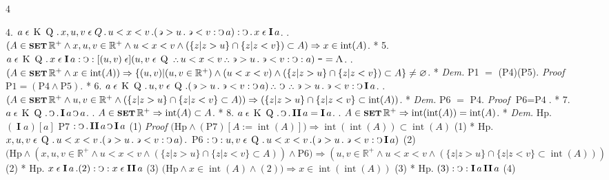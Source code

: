 \documentclass{book}
\newcommand{\s}{\switchcolumn} %
\newcommand{\C}{\mathop{\sbox0{$\displaystyle$$\reflectbox{C}$} %
\raisebox{-\height+\ht0-0.05cm}[\ht0][\dp0]{\scalebox{0.8}[0.8]{\copy0}}}\displaylimits} %
\newcommand{\p}{\mathop{\sbox0{$\displaystyle$$.$}
\raisebox{-\height+\ht0}[\ht0][\dp0]{\scalebox{1}[1]{\copy0}}}\displaylimits} %
\newcommand{\pppNoSpace}{\leavevmode\lower0ex\hbox{.}\kern-0.1em\raise0.7ex\hbox{.}\kern-0.1em\lower0ex\hbox{.}} %
\newcommand{\ppp}{\thinspace \pppNoSpace\thinspace} %
\newcommand{\no}{\mathop{\thinspace \scalebox{1.5}{-}}}
\newcommand{\abs}{\mathop{\rotatebox[origin=c]{180}{V}}}
\newcommand{\larger}{\mathrel{>}}
\newcommand{\smaller}{\mathrel{<}}
\newcommand{\such}{\thinspace \rotatebox[origin=c]{180}{$\epsilon$}}
\newcommand{\smallIn}{\ensuremath{\mathrel{\epsilon}}}
\newcommand{\I}{\mathop{\textbf{I}}}
\newcommand{\K}{\mathop{\thinspace \text{K} \thinspace}}
\newcommand{\Q}{\mathop{\thinspace \text{Q} \thinspace}}
\newcommand{\II}{\mathop{\textbf{I\hspace{0.02cm}I}}}
\newcommand{\setOfSets}{\mathop{\text{{\footnotesize \textbf{SET}}}}}
\renewcommand{\rightarrow}{\Rightarrow}
\DeclareMathOperator{\interior}{int}
\newenvironment{translateFourCol}[4]
               { %
                 \setcolumnwidth{#1\fill/1em, #2\fill/\columnsep, #3\fill/1em, #4\fill}
                 \begin{paracol}{4}
                 \newcommand{\LAT}{\switchcolumn[0]*}
                 \newcommand{\ENG}{\switchcolumn[2]}
               }
               { %
                 \let\ENG\undefined
                 \let\LAT\undefined
                 \end{paracol}
               }
\begin{document}
\begin{translateFourCol}{0.08}{0.42}{0.08}{0.42}
\raggedright
4. \s $a \smallIn \K \Q \p x,u,v \smallIn Q \p u \smaller x \smaller v \p (\such \larger u \p \such \smaller v : \C a) : \C \p x \smallIn \I a$.
\ENG
4. \s $(A \in \setOfSets \mathbb{R}^+ \wedge x,u,v \in \mathbb{R}^+ \wedge u < x < v \wedge (\{ z | z > u \} \cap \{ z | z < v \}) \subset A) \rightarrow x \in \interior(A)$.
\LAT
5. \s $a \smallIn \K \Q \p x \smallIn \I a : \C : [(u,v) \smallIn] (u,v \smallIn \Q \ppp u \smaller x \smaller v \ppp \such \larger u \p \such \smaller v : \C : a) \no = \abs$.
\ENG
5. \s $(A \in \setOfSets \mathbb{R}^+ \wedge x \in \interior(A)) \rightarrow \{ (u,v) | (u,v \in \mathbb{R}^+) \wedge ( u < x < v ) \wedge (\{ z | z > u \} \cap \{ z | z < v \}) \subset A \} \neq \varnothing$.
\LAT
\emph{Dem.} \s P1 $=$ (P4)(P5).
\ENG
\emph{Proof} \s $\text{P1} = (\text{P4} \wedge \text{P5})$.
\LAT
6. \s $a \smallIn \K \Q \p u,v \smallIn \Q \p (\such \larger u \p \such \smaller v : \C a) \ppp \C \ppp \such \larger u \p \such \smaller v : \C \I a$.
\ENG
6. \s $(A \in \setOfSets \mathbb{R}^+ \wedge u,v \in \mathbb{R}^+ \wedge (\{ z | z > u \} \cap \{ z | z < v \} \subset A)) \rightarrow (\{ z | z > u \} \cap \{ z | z < v \} \subset \interior(A))$.
\LAT
\emph{Dem.} \s P6 $=$ P4.
\ENG
\emph{Proof} \s $\text{P6} = \text{P4}$.
\LAT
7. \s $a \smallIn \K \Q \p \C \p \I a \C a$.
\ENG
7. \s $A \in \setOfSets \mathbb{R}^+ \rightarrow \interior(A) \subset A$.
\LAT
8. \s $ a \smallIn \K \Q \p \C \p \II a = \I a$.
\ENG
8. \s $A \in \setOfSets \mathbb{R}^+ \rightarrow \interior(\interior(A)) = \interior(A)$.
\LAT
\emph{Dem.} \s Hp. $(\I a) [a]$ P7 $: \C \p \II a \C \I a$ \hfill (1)
\ENG
\emph{Proof} \s $\Big( \text{Hp} \wedge (\text{P7})[A:=\interior(A)] \Big) \rightarrow \interior(\interior(A)) \subset \interior(A)$ \hfill (1)
\LAT
\s Hp. $x,u,v \smallIn \Q \p u \smaller x \smaller v \p (\such \larger u \p \such \smaller v : \C a) \p$ P6 $: \C : u,v \smallIn \Q \p u \smaller x \smaller v \p (\such \larger u \p \such \smaller v : \C \I a)$ \hfill (2)
\ENG
\s $\Big( \text{Hp} \wedge (x,u,v \in \mathbb{R}^+ \wedge u < x < v \wedge (\{ z | z > u \} \cap \{ z | z < v \} \subset A)) \wedge \text{P6} \Big) \rightarrow (u,v \in \mathbb{R}^+ \wedge u < x < v \wedge (\{ z | z > u \} \cap \{ z | z < v \} \subset \interior(A)))$ \hfill (2)
\LAT
\s Hp. $x \smallIn \I a \p (2) : \C : x \smallIn \II a$ \hfill (3)
\ENG
\s $\Big( \text{Hp} \wedge x \in \interior(A) \wedge (2) \Big) \rightarrow x \in \interior(\interior(A))$ \hfill (3)
\LAT
\s Hp. $(3) : \C : \I a \II a$ \hfill (4)

\end{translateFourCol}
\end{document}
